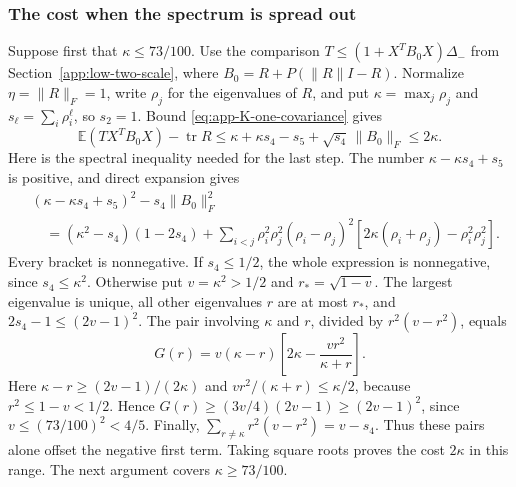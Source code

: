 \documentclass[11pt,a4paper]{article}
\numberwithin{equation}{section}
\begin{document}
\subsubsection{The cost when the spectrum is spread out}
Suppose first that $\kappa\le73/100$. Use the comparison
$T\le(1+X^TB_0X)\Delta_-$ from Section~\ref{app:low-two-scale},
where $B_0=R+P(\|R\|I-R)$.
Normalize $\eta=\|R\|_F=1$, write $\rho_j$ for the eigenvalues of $R$,
and put $\kappa=\max_j\rho_j$ and $s_\ell=\sum_i\rho_i^\ell$, so $s_2=1$.
Bound \eqref{eq:app-K-one-covariance} gives
\[
 \mathbb E(TX^TB_0X)-\operatorname{tr}R
 \le\kappa+\kappa s_4-s_5+\sqrt{s_4}\,\|B_0\|_F
 \le2\kappa.
\]
Here is the spectral inequality needed for the last step.
The number $\kappa-\kappa s_4+s_5$ is positive, and direct expansion gives
\[
 \begin{split}
 &(\kappa-\kappa s_4+s_5)^2-s_4\|B_0\|_F^2\\
 &\quad=(\kappa^2-s_4)(1-2s_4)
 +\sum_{i<j}\rho_i^2\rho_j^2(\rho_i-\rho_j)^2
       [2\kappa(\rho_i+\rho_j)-\rho_i^2\rho_j^2].
 \end{split}
\]
Every bracket is nonnegative. If $s_4\le1/2$, the whole expression is
nonnegative, since $s_4\le\kappa^2$.
Otherwise put $v=\kappa^2>1/2$ and $r_*=\sqrt{1-v}$.
The largest eigenvalue is unique, all other eigenvalues $r$ are at most
$r_*$, and $2s_4-1\le(2v-1)^2$.
The pair involving $\kappa$ and $r$, divided by $r^2(v-r^2)$, equals
\[
 G(r)=v(\kappa-r)
       \left[2\kappa-\frac{vr^2}{\kappa+r}\right].
\]
Here $\kappa-r\ge(2v-1)/(2\kappa)$ and
$vr^2/(\kappa+r)\le\kappa/2$, because $r^2\le1-v<1/2$.
Hence $G(r)\ge(3v/4)(2v-1)\ge(2v-1)^2$, since
$v\le(73/100)^2<4/5$.
Finally, $\sum_{r\ne\kappa}r^2(v-r^2)=v-s_4$.
Thus these pairs alone offset the negative first term.
Taking square roots proves the cost $2\kappa$ in this range.
The next argument covers $\kappa\ge73/100$.
\end{document}
